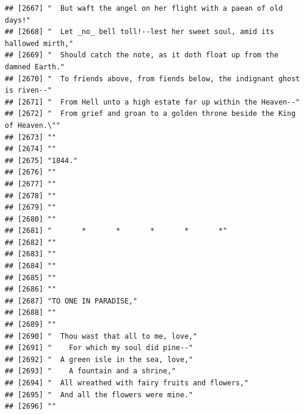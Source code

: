 \documentclass{article}\usepackage[]{graphicx}\usepackage[]{color}
\makeatletter
\newenvironment{kframe}{%
 \def\at@end@of@kframe{}%
 \ifinner\ifhmode%
  \def\at@end@of@kframe{\end{minipage}}%
  \begin{minipage}{\columnwidth}%
 \fi\fi%
 \def\FrameCommand##1{\hskip\@totalleftmargin \hskip-\fboxsep
 \colorbox{shadecolor}{##1}\hskip-\fboxsep
     \hskip-\linewidth \hskip-\@totalleftmargin \hskip\columnwidth}%
 \MakeFramed {\advance\hsize-\width
   \@totalleftmargin\z@ \linewidth\hsize
   \@setminipage}}%
 {\par\unskip\endMakeFramed%
 \at@end@of@kframe}
\newenvironment{knitrout}{}{} %
\makeatother
\begin{document}
\begin{knitrout}
\begin{kframe}
\begin{verbatim}
## [2667] "  But waft the angel on her flight with a paean of old days!"                
## [2668] "  Let _no_ bell toll!--lest her sweet soul, amid its hallowed mirth,"        
## [2669] "  Should catch the note, as it doth float up from the damned Earth."         
## [2670] "  To friends above, from fiends below, the indignant ghost is riven--"       
## [2671] "  From Hell unto a high estate far up within the Heaven--"                   
## [2672] "  From grief and groan to a golden throne beside the King of Heaven.\""      
## [2673] ""                                                                            
## [2674] ""                                                                            
## [2675] "1844."                                                                       
## [2676] ""                                                                            
## [2677] ""                                                                            
## [2678] ""                                                                            
## [2679] ""                                                                            
## [2680] ""                                                                            
## [2681] "       *       *       *       *       *"                                    
## [2682] ""                                                                            
## [2683] ""                                                                            
## [2684] ""                                                                            
## [2685] ""                                                                            
## [2686] ""                                                                            
## [2687] "TO ONE IN PARADISE,"                                                         
## [2688] ""                                                                            
## [2689] ""                                                                            
## [2690] "  Thou wast that all to me, love,"                                           
## [2691] "    For which my soul did pine--"                                            
## [2692] "  A green isle in the sea, love,"                                            
## [2693] "    A fountain and a shrine,"                                                
## [2694] "  All wreathed with fairy fruits and flowers,"                               
## [2695] "  And all the flowers were mine."                                            
## [2696] ""                                                                            

\end{verbatim}
\end{kframe}
\end{knitrout}
\end{document}
